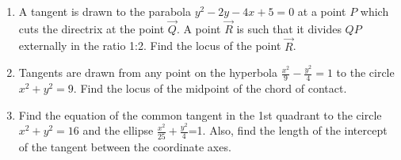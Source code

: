 \begin{enumerate}
\item A tangent is drawn to the parabola $y^2-2y-4x+5=0$ at a point $P$ which cuts the directrix at the point $\vec{Q}$. A point $\vec{R}$ is such that it divides $QP$ externally in the ratio 1:2. Find the locus of the point $\vec{R}$. \hfill{}

\item Tangents are drawn from any point on the hyperbola $\frac{x^2}{9}-\frac{y^2}{4}=1$ to the circle $x^2+y^2=9$. Find the locus of the midpoint of the chord of contact. \hfill{}

\item Find the equation of the common tangent in the 1st quadrant to the circle $x^2+y^2=16$ and the ellipse $\frac{x^2}{25}+\frac{y^2}{4}$=1. Also, find the length of the intercept of the tangent between the coordinate axes. \hfill{} 


\end{enumerate}
